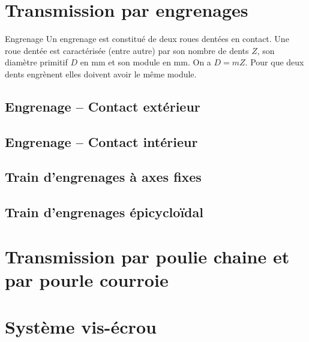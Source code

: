 \def\xxactivite{Cours}
\def\xxauteur{\textsl{Xavier Pessoles}}

\fichetrue
\proftrue
\tdfalse
\coursfalse

\def\xxnumpartie{Rév -- Cin}
\def\xxpartie{Modélisation des actions mécaniques dans les systèmes}
\def\xxnumchapitre{ Révisions 4\vspace{.2cm}}
\def\xxchapitre{\hspace{.12cm} Transmetteurs de puissance}

\def\xxpied{%
Révisions Cinématique -- \xxchapitre \\
Fiche 4 -- \xxactivite%
}


\def\xxcompetences{%
\textsl{%
\textbf{Savoirs et compétences :}\\
}}


\iflivret

\else

\fi
\setlength{\columnseprule}{.1pt}

\vspace{2cm}
\pagestyle{fancy}
\thispagestyle{plain}

\section*{Transmission par engrenages}
\begin{defi}{Engrenage}
Un engrenage est constitué de deux roues dentées en contact. Une roue dentée est caractérisée (entre autre) par son nombre de dents $Z$, son diamètre primitif $D$ en \si{mm} et son module en \si{mm}. On a $D=mZ$.
Pour que deux dents engrènent elles doivent avoir le même module.
\end{defi}

\subsection*{Engrenage -- Contact extérieur}

\subsection*{Engrenage -- Contact intérieur}

\subsection*{Train d'engrenages à axes fixes}

\subsection*{Train d'engrenages épicycloïdal}

\section*{Transmission par poulie chaine et par pourle courroie}

\section*{Système vis-écrou}

